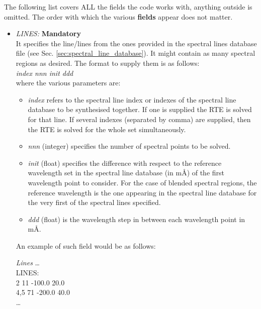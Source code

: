 The following list covers ALL the fields the code works with, anything outside is omitted. The order with which the various {\bf fields} appear does not matter.\\

\begin{itemize}

  \item {\it LINES:} {\bf Mandatory}\\
It specifies the line/lines from the ones provided in the spectral lines database file (see Sec. \ref{sec:spectral_line_database}). It might contain as many spectral regions as desired. The format to supply them is as follows:\\

  {\it index  nnn   init    ddd}\\

  where the various parameters are:
  \begin{itemize}

    \item {\it index} refers to the spectral line index or indexes of the spectral line database to be synthesised together. If one is supplied the RTE is solved for that line. If several indexes (separated by comma) are supplied, then the RTE is solved for the whole set simultaneously.

    \item {\it nnn} (integer) specifies the number of spectral points to be solved.

    \item {\it init} (float) specifies the difference with respect to the reference wavelength set in the spectral line database (in m{\AA}) of the first wavelength point to consider. For the case of blended spectral regions, the reference wavelength is the one appearing in the spectral line database for the very first of the spectral lines specified.

    \item {\it ddd} (float) is the wavelength step in between each wavelength point in m{\AA}.

  \end{itemize}
  An example of such field would be as follows:\\
\begin{ifbox}[label={tb:lines}]{{\it Lines}}
  \scriptsize
  \ldots\\
  LINES:\\
  2 11 -100.0 20.0\\
  4,5 71 -200.0 40.0\\
  \ldots
  \normalsize
\end{ifbox}


\end{itemize}
